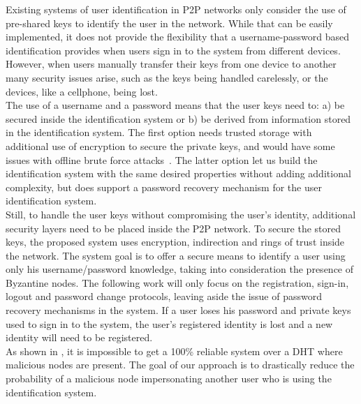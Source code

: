 Existing systems of user identification in P2P networks only consider the
use of pre-shared keys to identify the user in the network. While that can
be easily implemented, it does not provide the flexibility that a
username-password based identification provides when 
users sign in to the system from different devices.
However, when users manually transfer their keys from one device to another
many security issues arise, such as the keys being handled carelessly, or the
devices, like a cellphone, being lost.\\

The use of a username and a password means that the user keys need to: a) be
secured inside the identification system or b) be derived from information
stored in the identification system. The first option
needs trusted storage with additional use of encryption to secure the
private keys, and would have some issues with offline brute force
attacks~\cite{kreitz2012passwords}. The latter option let us build the identification system with the same desired properties without adding
additional complexity, but does support a password recovery mechanism for the
user identification system.\\

Still, to handle the user keys without compromising the user's identity, additional
security layers need to be placed inside the P2P network.
To secure the stored keys, the proposed system uses encryption, indirection and
rings of trust inside the network. The system goal is to offer a secure means to
identify a user using only his username/password knowledge, taking into
consideration the presence of Byzantine nodes. The following work will only
focus on the registration, sign-in, logout and password change protocols,
leaving aside the issue of password recovery mechanisms in the system. If
a user loses his password and private keys used to sign in to the system, the
user's registered identity is lost and a new identity will need to be registered.\\

As shown in \cite{the_sybil_attack}, it is impossible to get a 100\% reliable
system over a DHT where malicious nodes are present. 
The goal of our approach is to drastically reduce the probability of a
malicious node impersonating another user who is using the identification
system.\\


